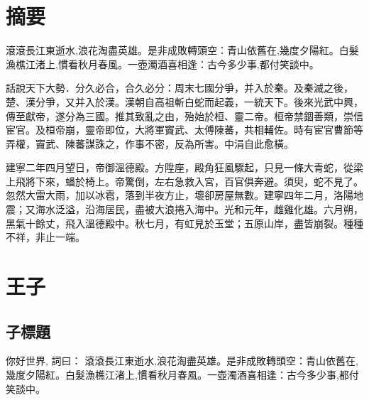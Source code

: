 \documentclass[12pt]{article}
\begin{document}
\setcounter{page}{1}  %


\section*{\centering 摘要}  %
滾滾長江東逝水,浪花淘盡英雄。是非成敗轉頭空：青山依舊在,幾度夕陽紅。白髮漁樵江渚上,慣看秋月春風。一壺濁酒喜相逢：古今多少事,都付笑談中。

話說天下大勢．分久必合，合久必分：周末七國分爭，并入於秦。及秦滅之後，楚、漢分爭，又并入於漢。漢朝自高祖斬白蛇而起義，一統天下。後來光武中興，傳至獻帝，遂分為三國。推其致亂之由，殆始於桓、靈二帝。桓帝禁錮善類，崇信宦官。及桓帝崩，靈帝即位，大將軍竇武、太傅陳蕃，共相輔佐。時有宦官曹節等弄權，竇武、陳蕃謀誅之，作事不密，反為所害。中涓自此愈橫。

建寧二年四月望日，帝御溫德殿。方陞座，殿角狂風驟起，只見一條大青蛇，從梁上飛將下來，蟠於椅上。帝驚倒，左右急救入宮，百官俱奔避。須臾，蛇不見了。忽然大雷大雨，加以冰雹，落到半夜方止，壞卻房屋無數。建寧四年二月，洛陽地震；又海水泛溢，沿海居民，盡被大浪捲入海中。光和元年，雌雞化雄。六月朔，黑氣十餘丈，飛入溫德殿中。秋七月，有虹見於玉堂；五原山岸，盡皆崩裂。種種不祥，非止一端。


    
\newpage  %


\begin{center}
\tableofcontents  %
\thispagestyle{empty}  %
\end{center}


\newpage  %

\setcounter{page}{1}  %

\section{王子}
\subsection{子標題}  

\hspace{2em}你好世界, 詞曰：
滾滾長江東逝水,浪花淘盡英雄。是非成敗轉頭空：青山依舊在,幾度夕陽紅。白髮漁樵江渚上,慣看秋月春風。一壺濁酒喜相逢：古今多少事,都付笑談中。
\end{document}
